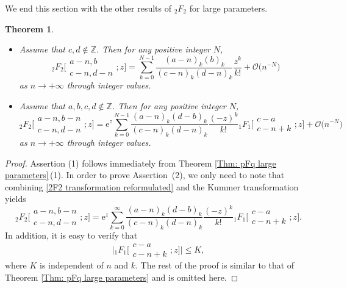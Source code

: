 \documentclass[pdftex]{sigma}
\numberwithin{equation}{section}
\newtheorem{Theorem}{Theorem}[section]
\newcommand{\ZZ}{\ensuremath{\mathbb{Z}}}
\newcommand{\me}{\mathrm{e}}
\newcommand{\mo}{\mathcal{O}}
\begin{document}
We end this section with the other results of $_2F_2$ for large parameters.

\begin{Theorem}\label{Thm: 2F2 other results}
	~
	\begin{itemize}\itemsep=0pt
		\item[$(1)$] Assume that $c,d\notin\ZZ$. Then for any positive integer $N$,
		\[{}_2F_2\biggl[\begin{matrix}
			a-n,b\\
			c-n,d-n
		\end{matrix};z\biggr]=\sum_{k=0}^{N-1}\frac{(a-n)_k(b)_k}{(c-n)_k(d-n)_k}\frac{z^k}{k!}+\mo\big(n^{-N}\big)\]
		as $n\to +\infty$ through integer values.
		
		\item[$(2)$] Assume that $a,b,c,d\notin\ZZ$. Then for any positive integer $N$,
			\[{}_2F_2\biggl[\begin{matrix}
				a-n,b-n\\
				c-n,d-n
			\end{matrix};z\biggr]=\me^z\sum_{k=0}^{N-1}\frac{(a-n)_k(d-b)_k}{(c-n)_k(d-n)_k}\frac{(-z)^k}{k!}{}_1F_1\biggl[\begin{matrix}
				c-a\\
				c-n+k
			\end{matrix};z\biggr]+\mo\big(n^{-N}\big)\]
			as $n\to +\infty$ through integer values.
	\end{itemize}
\end{Theorem}

\begin{proof}
	Assertion (1) follows immediately from Theorem \ref{Thm: pFq large parameters}\,(1). In order to prove Assertion~(2), we only need to note that combining \eqref{2F2 transformation reformulated} and the Kummer transformation \cite[equation~(13.2.39)]{NIST-Handbook} yields
		\[
		{}_2F_2\biggl[\begin{matrix}
			a-n,b-n\\
			c-n,d-n
		\end{matrix};z\biggr]
		=\mathrm{e}^z\sum_{k=0}^{\infty}\frac{(a-n)_k(d-b)_k}{(c-n)_k(d-n)_k}\frac{(-z)^k}{k!}{}_1F_1\biggl[\begin{matrix}
			c-a\\
			c-n+k
		\end{matrix};z\biggr].
		\]
		In addition, it is easy to verify that
		\[
		\biggl|{}_1F_1\biggl[\begin{matrix}
			c-a\\
			c-n+k
		\end{matrix};z\biggr]\biggr|\leqslant K,
		\]
		where $K$ is independent of $n$ and $k$. The rest of the proof is similar to that of Theorem \ref{Thm: pFq large parameters} and is omitted here.
\end{proof}
\end{document}
